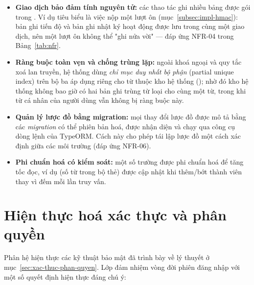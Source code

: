 \begin{itemize}
  \item \textbf{Giao dịch bảo đảm tính nguyên tử:} các thao tác ghi nhiều
        bảng được gói trong . Ví dụ tiêu
        biểu là việc nộp một lượt ôn (mục~\ref{subsec:impl-hmac}): bản ghi
        tiến độ và bản ghi nhật ký hoạt động được lưu trong cùng một giao
        dịch, nên một lượt ôn không thể "ghi nửa vời" --- đáp ứng NFR-04 trong
        Bảng~\ref{tab:nfr}.
  \item \textbf{Ràng buộc toàn vẹn và chống trùng lặp:} ngoài khoá ngoại và
        quy tắc xoá lan truyền, hệ thống dùng \textit{chỉ mục duy nhất bộ
        phận} (partial unique index) trên bộ ba  áp dụng riêng cho từ thuộc kho hệ thống
        (); nhờ đó kho hệ thống không bao giờ có
        hai bản ghi trùng từ loại cho cùng một từ, trong khi từ cá nhân của
        người dùng vẫn không bị ràng buộc này.
  \item \textbf{Quản lý lược đồ bằng migration:} mọi thay đổi lược đồ được mô
        tả bằng các \textit{migration} có thể phiên bản hoá, được nhận diện và
        chạy qua công cụ dòng lệnh của TypeORM. Cách này cho phép tái lập lược
        đồ một cách xác định giữa các môi trường (đáp ứng NFR-06).
  \item \textbf{Phi chuẩn hoá có kiểm soát:} một số trường được phi chuẩn hoá
        để tăng tốc đọc, ví dụ  (số từ trong bộ thẻ)
        được cập nhật khi thêm/bớt thành viên thay vì đếm mỗi lần truy vấn.
\end{itemize}

\section{Hiện thực hoá xác thực và phân quyền}
\label{sec:hien-thuc-auth}

Phân hệ  hiện thực các kỹ thuật bảo mật đã trình bày về lý thuyết
ở mục~\ref{sec:xac-thuc-phan-quyen}. Lớp  đảm nhiệm vòng
đời phiên đăng nhập với một số quyết định hiện thực đáng chú ý:

